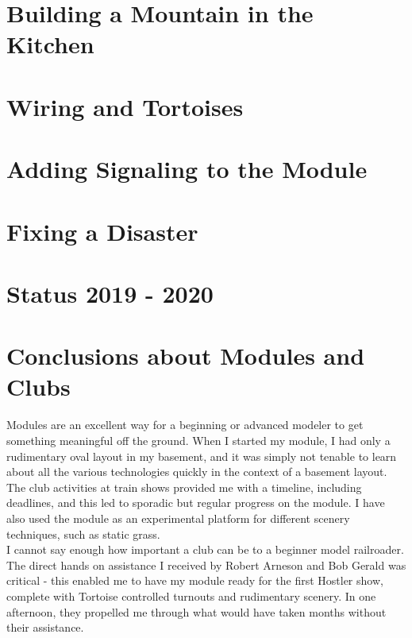 \section{Building a Mountain in the Kitchen}

\section{Wiring and Tortoises}

\section{Adding Signaling to the Module}

\section{Fixing a Disaster}

\section{Status 2019 - 2020}

\section{Conclusions about Modules and Clubs}
Modules are an excellent way for a beginning or advanced modeler to get something meaningful off the ground.  When I started my module, I had only a rudimentary oval layout in my basement, and it was simply not tenable to learn about all the various technologies quickly in the context of a basement layout.  The club activities at train shows provided me with a timeline, including deadlines, and this led to sporadic but regular progress on the module.  I have also used the module as an experimental platform for different scenery techniques, such as static grass.\\

I cannot say enough how important a club can be to a beginner model railroader.  The direct hands on assistance I received by Robert Arneson and Bob Gerald was critical - this enabled me to have my module ready for the first Hostler show, complete with Tortoise controlled turnouts and rudimentary scenery.  In one afternoon, they propelled me through what would have taken months without their assistance.